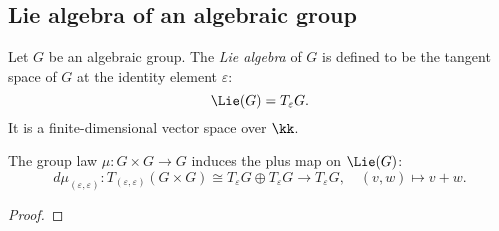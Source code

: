 

\subsection{Lie algebra of an algebraic group}

    Let \(G\) be an algebraic group.
    The \emph{Lie algebra} of \(G\) is defined to be the tangent space of \(G\) at the identity element \(\varepsilon\):
    \[
        \Lie(G) = T_\varepsilon G.
    \]
    It is a finite-dimensional vector space over \(\kk\).

    \begin{proposition}\label{prop:multiplication_of_group_induces_plus_on_Lie_algebra}
        The group law \(\mu: G \times G \to G\) induces the plus map on \(\Lie(G)\):
        \[
            d\mu_{(\varepsilon,\varepsilon)}: T_{(\varepsilon,\varepsilon)}(G \times G) \cong T_\varepsilon G \oplus T_\varepsilon G \to T_\varepsilon G, \quad (v,w) \mapsto v + w.
        \]
    \end{proposition}
    \begin{proof}
        
    \end{proof}